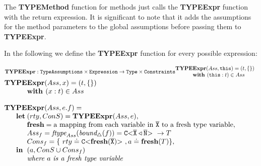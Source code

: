 \documentclass[runningheads]{llncs}
\begin{document}
The \textbf{TYPEMethod} function for methods just calls the \textbf{TYPEExpr} function with the
return expression. It is significant to note that it adds the assumptions for the method parameters to the global assumptions before passing them to \textbf{TYPEExpr}.

\smallskip

In the following we define the \textbf{TYPEExpr} function for every possible expression:

\smallskip

$\textbf{TYPEExpr}:\texttt{TypeAssumptions} \times
\texttt{Expression} \rightarrow \texttt{Type} \times \texttt{Constraints}\\
\begin{array}{@{}l@{}l}
\textbf{TY} \textbf{PE} & \textbf{Expr} (Ass, \mathtt{this}) = (t , \{\})\\
& \textbf{with } (\mathtt{this} : t) \in Ass 
\end{array}
$
\smallskip
$\begin{array}{@{}l@{}l}
\textbf{TY} \textbf{PE} & \textbf{Expr} (Ass,x) = (t , \{\})\\
& \textbf{with } (x : t) \in Ass 
\end{array}
$

\smallskip

$\begin{array}{@{}l@{}l@{}l}
\textbf{TY}& \textbf{PE} & \textbf{Expr} (Ass, e.f ) = \\
& \textbf{let} %
& (rty, ConS) = \textbf{TYPEExpr}(Ass, e),\\
& & \textbf{fresh} = \text{a mapping from each variable in}\ \ol{X} \ \text{to a fresh type variable},\\
& & Ass_{f} = \textit{ftype}_{Ass}(\textit{bound}_\triangle(f)) = \exptype{C}{\ol{X} \triangleleft \ol{N}} \to T \\
& & Cons_{f} = \{\ rty \doteq \exptype{C}{\textbf{fresh}(\ol{X})}, a \doteq \textbf{fresh}(T)\},\\
& \mathbf{in}%
& (a, ConS \cup Cons_{f})\\
& & \mathit{where\ } a \mathit{\ is\ a\ fresh\
  type\ variable}\\ 
\end{array}
$
\end{document}
